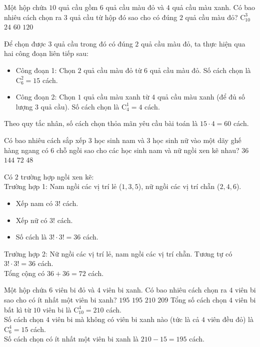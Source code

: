 \begin{ex}%
	Một hộp chứa $10$ quả cầu gồm $6$ quả cầu màu đỏ và $4$ quả cầu màu xanh. Có bao nhiêu cách chọn ra $3$ quả cầu từ hộp đó sao cho có đúng $2$ quả cầu màu đỏ?
	\choice
	{$\mathrm{C}_{10}^3$}
	{$24$}
	{\True $60$}
	{$120$}
	\loigiai
	{
		Để chọn được $3$ quả cầu trong đó có đúng $2$ quả cầu màu đỏ, ta thực hiện qua hai công đoạn liên tiếp sau:
		\begin{itemize}
			\item Công đoạn 1: Chọn $2$ quả cầu màu đỏ từ $6$ quả cầu màu đỏ. Số cách chọn là $\mathrm{C}_6^2 = 15$ cách.
			\item Công đoạn 2: Chọn $1$ quả cầu màu xanh từ $4$ quả cầu màu xanh (để đủ số lượng $3$ quả cầu). Số cách chọn là $\mathrm{C}_4^1 = 4$ cách.
		\end{itemize}
		Theo quy tắc nhân, số cách chọn thỏa mãn yêu cầu bài toán là $15 \cdot  4 = 60$ cách.
	}
\end{ex}
\begin{ex}%
	Có bao nhiêu cách sắp xếp $3$ học sinh nam và $3$ học sinh nữ vào một dãy ghế hàng ngang có $6$ chỗ ngồi sao cho các học sinh nam và nữ ngồi xen kẽ nhau?
	\choice
	{$36$}
	{$144$}
	{\True $72$}
	{$48$}
	\loigiai
	{
		Có $2$ trường hợp ngồi xen kẽ:\\
		Trường hợp 1: Nam ngồi các vị trí lẻ ($1, 3, 5$), nữ ngồi các vị trí chẵn ($2, 4, 6$).
		\begin{itemize}
			\item Xếp nam có $3!$ cách.
			\item Xếp nữ có $3!$ cách.
			\item Số cách là $3! \cdot  3! = 36$ cách.
		\end{itemize}
		Trường hợp 2: Nữ ngồi các vị trí lẻ, nam ngồi các vị trí chẵn. Tương tự có $3! \cdot  3! = 36$ cách.\\
		Tổng cộng có $36 + 36 = 72$ cách.
	}
\end{ex}
\begin{ex}%
	Một hộp chứa $6$ viên bi đỏ và $4$ viên bi xanh. Có bao nhiêu cách chọn ra $4$ viên bi sao cho có ít nhất một viên bi xanh?
	\choice
	{$195$}
	{\True $195$}
	{$210$}
	{$209$}
	\loigiai
	{
		Tổng số cách chọn $4$ viên bi bất kì từ $10$ viên bi là $\mathrm{C}_{10}^4 = 210$ cách.\\
		Số cách chọn $4$ viên bi mà không có viên bi xanh nào (tức là cả $4$ viên đều đỏ) là $\mathrm{C}_6^4 = 15$ cách.\\
		Số cách chọn có ít nhất một viên bi xanh là $210 - 15 = 195$ cách.
	}
\end{ex}
